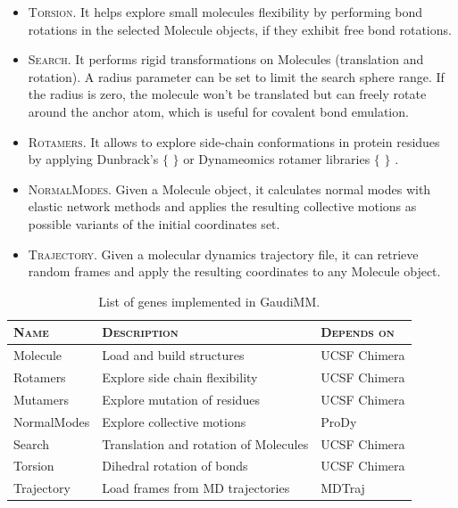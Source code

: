 \begin{itemize}
	\item \textsc{Torsion}. It helps explore small molecules flexibility by performing bond rotations in the selected Molecule objects, if they exhibit free bond rotations.

	\item \textsc{Search}. It performs rigid transformations on Molecules (translation and rotation). A radius parameter can be set to limit the search sphere range. If the radius is zero, the molecule won’t be translated but can freely rotate around the anchor atom, which is useful for covalent bond emulation.

	\item \textsc{Rotamers}. It allows to explore side-chain conformations in protein residues by applying Dunbrack’s $ \{ $ $ \} $  or Dynameomics rotamer libraries $ \{ $ $ \} $ .

	\item \textsc{NormalModes}. Given a Molecule object, it calculates normal modes with elastic network methods and applies the resulting collective motions as possible variants of the initial coordinates set.

	\item \textsc{Trajectory}. Given a molecular dynamics trajectory file, it can retrieve random frames and apply the resulting coordinates to any Molecule object.
\end{itemize}


\begin{table}[hbtp]
	\caption[List of genes implemented in GaudiMM]{List of genes implemented in GaudiMM.}
	\label{table:gaudi-genes}
\footnotesize
{}%
%
%
\begin{tabularx}{\textwidth}{LMR}
\toprule
\textsc{Name} & \textsc{Description} & \textsc{Depends on} \\
\toprule
 Molecule & Load and build structures & UCSF Chimera \\
\hhline{~~~}
 Rotamers & Explore side chain flexibility & UCSF Chimera \\
\hhline{~~~}
 Mutamers & Explore mutation of residues & UCSF Chimera \\
\hhline{~~~}
 NormalModes & Explore collective motions & ProDy \\
\hhline{~~~}
 Search & Translation and rotation of Molecules & UCSF Chimera \\
\hhline{~~~}
 Torsion & Dihedral rotation of bonds & UCSF Chimera \\
\hhline{~~~}
 Trajectory & Load frames from MD trajectories & MDTraj \\
\bottomrule
\end{tabularx}
\end{table}


